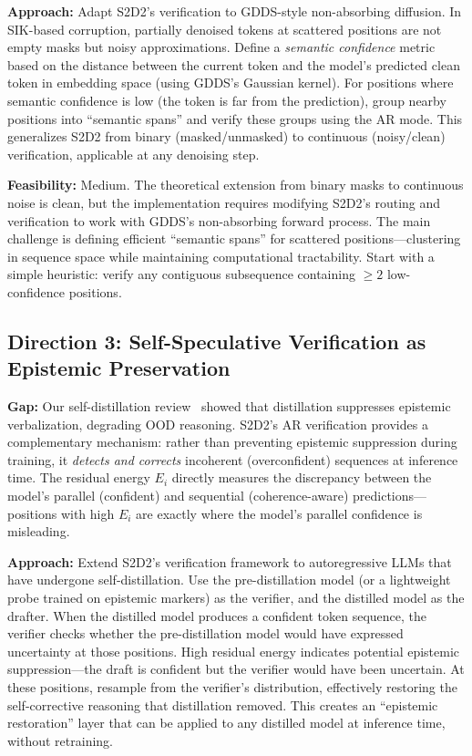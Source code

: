 \documentclass[11pt]{article}
\begin{document}
\textbf{Approach:} Adapt S2D2's verification to GDDS-style non-absorbing diffusion. In SIK-based corruption, partially denoised tokens at scattered positions are not empty masks but noisy approximations. Define a \textit{semantic confidence} metric based on the distance between the current token and the model's predicted clean token in embedding space (using GDDS's Gaussian kernel). For positions where semantic confidence is low (the token is far from the prediction), group nearby positions into ``semantic spans'' and verify these groups using the AR mode. This generalizes S2D2 from binary (masked/unmasked) to continuous (noisy/clean) verification, applicable at any denoising step.

\textbf{Feasibility:} Medium. The theoretical extension from binary masks to continuous noise is clean, but the implementation requires modifying S2D2's routing and verification to work with GDDS's non-absorbing forward process. The main challenge is defining efficient ``semantic spans'' for scattered positions---clustering in sequence space while maintaining computational tractability. Start with a simple heuristic: verify any contiguous subsequence containing $\geq 2$ low-confidence positions.

\subsection{Direction 3: Self-Speculative Verification as Epistemic Preservation}

\textbf{Gap:} Our self-distillation review~\cite{selfdistill} showed that distillation suppresses epistemic verbalization, degrading OOD reasoning. S2D2's AR verification provides a complementary mechanism: rather than preventing epistemic suppression during training, it \textit{detects and corrects} incoherent (overconfident) sequences at inference time. The residual energy $E_i$ directly measures the discrepancy between the model's parallel (confident) and sequential (coherence-aware) predictions---positions with high $E_i$ are exactly where the model's parallel confidence is misleading.

\textbf{Approach:} Extend S2D2's verification framework to autoregressive LLMs that have undergone self-distillation. Use the pre-distillation model (or a lightweight probe trained on epistemic markers) as the verifier, and the distilled model as the drafter. When the distilled model produces a confident token sequence, the verifier checks whether the pre-distillation model would have expressed uncertainty at those positions. High residual energy indicates potential epistemic suppression---the draft is confident but the verifier would have been uncertain. At these positions, resample from the verifier's distribution, effectively restoring the self-corrective reasoning that distillation removed. This creates an ``epistemic restoration'' layer that can be applied to any distilled model at inference time, without retraining.
\end{document}
